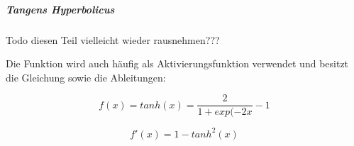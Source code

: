 \subparagraph{Tangens Hyperbolicus}

Todo diesen Teil vielleicht wieder rausnehmen???

Die Funktion wird auch häufig als Aktivierungsfunktion verwendet und besitzt die Gleichung sowie die Ableitungen: 

\begin{equation}
f(x) = tanh(x) = \frac{2}{1+exp(-2x}-1
\end{equation}

\begin{equation}
f'(x) = 1 - tanh^2(x)
\end{equation}

